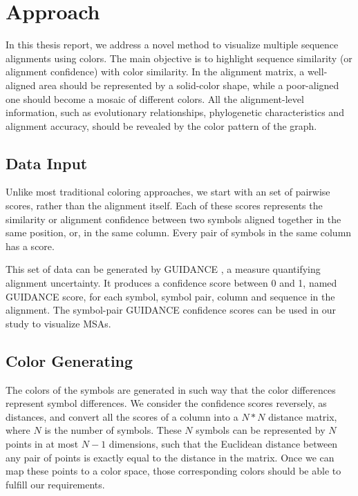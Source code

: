 \chapter{Approach}\label{chap:Approach}

In this thesis report, we address a novel method to visualize multiple sequence alignments using colors. The main objective is to highlight sequence similarity (or alignment confidence) with color similarity. In the alignment matrix, a well-aligned area should be represented by a solid-color shape, while a poor-aligned one should become a mosaic of different colors. All the alignment-level information, such as evolutionary relationships, phylogenetic characteristics and alignment accuracy, should be revealed by the color pattern of the graph.

\section{Data Input}

Unlike most traditional coloring approaches, we start with an set of pairwise scores, rather than the alignment itself. Each of these scores represents the similarity or alignment confidence between two symbols aligned together in the same position, or, in the same column. Every pair of symbols in the same column has a score.

This set of data can be generated by GUIDANCE \cite{Penn:2010aa,Penn:2010ab}, a measure quantifying alignment uncertainty. It produces a confidence score between 0 and 1, named GUIDANCE score, for each symbol, symbol pair, column and sequence in the alignment. The symbol-pair GUIDANCE confidence scores can be used in our study to visualize MSAs.

\section{Color Generating}

The colors of the symbols are generated in such way that the color differences represent symbol differences. We consider the confidence scores reversely, as distances, and convert all the scores of a column into a $N*N$ distance matrix, where $N$ is the number of symbols. These $N$ symbols can be represented by $N$ points in at most $N-1$ dimensions, such that the Euclidean distance between any pair of points is exactly equal to the distance in the matrix. Once we can map these points to a color space, those corresponding colors should be able to fulfill our requirements.

